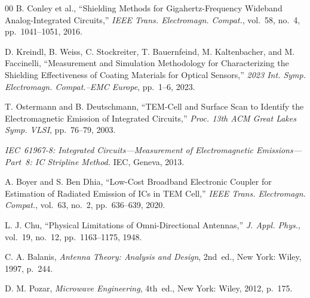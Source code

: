 \documentclass[conference]{IEEEtran}
\begin{document}
\begin{thebibliography}{00}
B. Conley et al., ``Shielding Methods for Gigahertz-Frequency Wideband
Analog-Integrated Circuits,'' \textit{IEEE Trans. Electromagn. Compat.},
vol.~58, no.~4, pp.~1041--1051, 2016.

D. Kreindl, B. Weiss, C. Stockreiter, T. Bauernfeind, M. Kaltenbacher,
and M. Faccinelli, ``Measurement and Simulation Methodology for
Characterizing the Shielding Effectiveness of Coating Materials for
Optical Sensors,'' \textit{2023 Int. Symp. Electromagn. Compat.--EMC
Europe}, pp.~1--6, 2023.

T. Ostermann and B. Deutschmann, ``TEM-Cell and Surface Scan to Identify
the Electromagnetic Emission of Integrated Circuits,'' \textit{Proc.
13th ACM Great Lakes Symp. VLSI}, pp.~76--79, 2003.

\textit{IEC~61967-8: Integrated Circuits---Measurement of Electromagnetic
Emissions---Part~8: IC Stripline Method.} IEC, Geneva, 2013.

A. Boyer and S. Ben Dhia, ``Low-Cost Broadband Electronic Coupler for
Estimation of Radiated Emission of ICs in TEM Cell,''
\textit{IEEE Trans. Electromagn. Compat.}, vol.~63, no.~2,
pp.~636--639, 2020.

L. J. Chu, ``Physical Limitations of Omni-Directional Antennas,''
\textit{J. Appl. Phys.}, vol.~19, no.~12, pp.~1163--1175, 1948.

C. A. Balanis, \textit{Antenna Theory: Analysis and Design}, 2nd~ed.,
New York: Wiley, 1997, p.~244.

D. M. Pozar, \textit{Microwave Engineering}, 4th~ed.,
New York: Wiley, 2012, p.~175.
\end{thebibliography}
\end{document}
